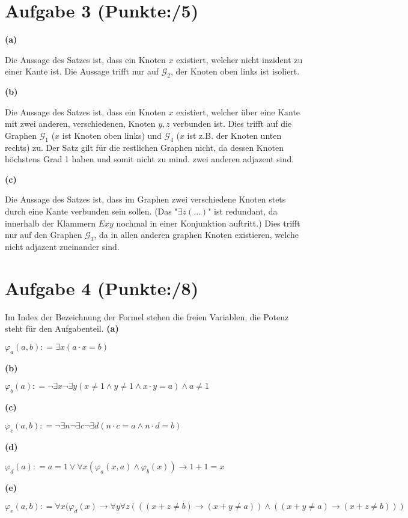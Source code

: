 \documentclass[11pt, a4paper]{article}
\newcommand{\pp}{5}
\newcommand{\ppp}{8}
\newcommand{\defgr}{\mathrel{\mathop:\!\!=}}
\begin{document}
\section*{Aufgabe 3 (Punkte:\qquad/\pp)}
\textbf{(a)}
\begin{adjustwidth}{20pt}{20pt}
	Die Aussage des Satzes ist, dass ein Knoten $x$ existiert, welcher nicht inzident zu einer Kante ist. Die Aussage trifft nur auf $\mathcal{G}_2$, der Knoten oben links ist isoliert.
\end{adjustwidth}
\textbf{(b)}
\begin{adjustwidth}{20pt}{20pt}
	Die Aussage des Satzes ist, dass ein Knoten $x$ existiert, welcher über eine Kante mit zwei anderen, verschiedenen, Knoten $y,z$ verbunden ist. Dies trifft auf die Graphen
	 $\mathcal{G}_1$ ($x$ ist Knoten oben links) und  $\mathcal{G}_4$ ($x$ ist z.B. der Knoten unten rechts) zu. Der Satz gilt für die restlichen Graphen nicht, da dessen Knoten
	höchstens Grad 1 haben und somit nicht zu mind. zwei anderen adjazent sind.
\end{adjustwidth}
\textbf{(c)}
\begin{adjustwidth}{20pt}{20pt}
	Die Aussage des Satzes ist, dass im Graphen zwei verschiedene Knoten stets durch eine Kante verbunden sein sollen. (Das "$\exists z(...)$" ist redundant, da innerhalb der Klammern
	$Exy$ nochmal in einer Konjunktion auftritt.) Dies trifft nur auf den Graphen  $\mathcal{G}_3$, da in allen anderen graphen Knoten existieren, welche nicht adjazent zueinander sind.
\end{adjustwidth}



\section*{Aufgabe 4 (Punkte:\qquad/\ppp)}
Im Index der Bezeichnung der Formel stehen die freien Variablen, die Potenz steht für den Aufgabenteil.\newpage
\noindent\textbf{(a)}
\begin{adjustwidth}{20pt}{20pt}
	$\varphi_{a}(a,b) \defgr \exists x(a \cdot x = b)$
\end{adjustwidth}
\textbf{(b)}
\begin{adjustwidth}{20pt}{20pt}
	$\varphi_{b}(a) \defgr \neg\exists x \neg\exists y(x \neq 1 \wedge y \neq 1 \wedge x \cdot y = a) \wedge a \neq 1$
\end{adjustwidth}
\textbf{(c)}
\begin{adjustwidth}{20pt}{20pt}
	$\varphi_{c}(a,b) \defgr \neg\exists n \neg\exists c \neg\exists d(n \cdot c = a \wedge n \cdot d = b)$
\end{adjustwidth}
\textbf{(d)}
\begin{adjustwidth}{20pt}{20pt}
	$\varphi_{d}(a) \defgr a=1 \vee \forall x (\varphi_a(x,a) \wedge \varphi_b(x)) \rightarrow 1+1=x$
\end{adjustwidth}
\textbf{(e)}
\begin{adjustwidth}{20pt}{20pt}
	$\varphi_{e}(a,b) \defgr \forall x (\varphi_d(x) \rightarrow \forall y \forall z (((x+z \neq b) \rightarrow (x + y \neq a)) \wedge ((x+y\neq a) \rightarrow (x+z \neq b)))$
\end{adjustwidth}
\end{document}
